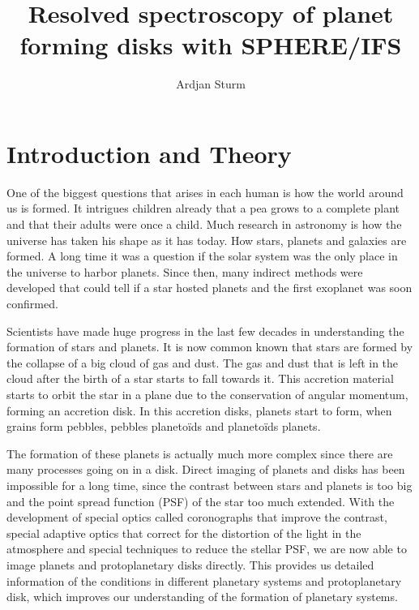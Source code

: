 \documentclass[twoside,single]{lion-msc}
\title{Resolved spectroscopy of planet forming disks with SPHERE/IFS}
\author{Ardjan Sturm}
\affiliation{Huygens-Kamerlingh Onnes Laboratory, Leiden University}   %
\begin{document}

\maketitle

\tableofcontents
\cleardoublepage



\chapter{Introduction and Theory}
One of the biggest questions that arises in each human is how the world around us is formed. It intrigues children already that a pea grows to a complete plant and that their adults were once a child. Much research in astronomy is how the universe has taken his shape as it has today. How stars, planets and galaxies are formed. A long time it was a question if the solar system was the only place in the universe to harbor planets. Since then, many indirect methods were developed that could tell if a star hosted planets and the first exoplanet was soon confirmed.
\bigskip

Scientists have made huge progress in the last few decades in understanding the formation of stars and planets. It is now common known that stars are formed by the collapse of a big cloud of gas and dust. The gas and dust that is left in the cloud after the birth of a star starts to fall towards it. This accretion material starts to orbit the star in a plane due to the conservation of angular momentum, forming an accretion disk. In this accretion disks, planets start to form, when grains form pebbles, pebbles planeto\"ids and planeto\"ids planets. 
\bigskip

The formation of these planets is actually much more complex since there are many processes going on in a disk. Direct imaging of planets and disks has been impossible for a long time, since the contrast between stars and planets is too big and the point spread function (PSF) of the star too much extended. With the development of special optics called coronographs that improve the contrast, special adaptive optics that correct for the distortion of the light in the atmosphere and special techniques to reduce the stellar PSF, we are now able to image planets and protoplanetary disks directly. This provides us detailed information of the conditions in different planetary systems and protoplanetary disk, which improves our understanding of the formation of planetary systems.
\bigskip
\end{document}
